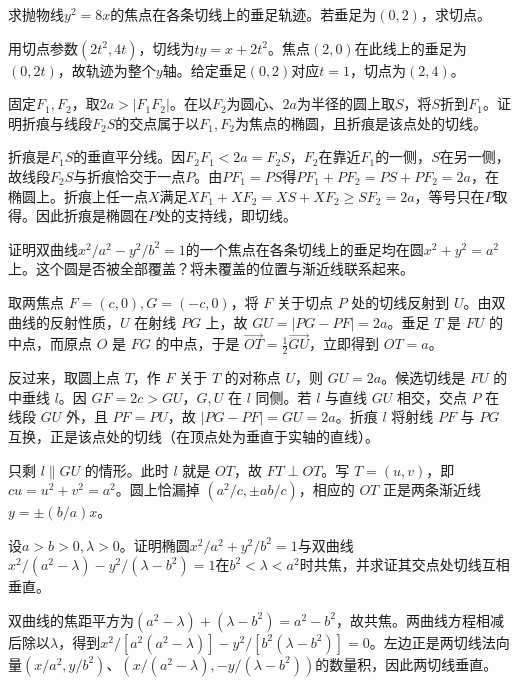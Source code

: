 求抛物线\(y^2=8x\)的焦点在各条切线上的垂足轨迹。若垂足为\((0,2)\)，求切点。
\par
\solutionanswer
用切点参数\((2t^2,4t)\)，切线为\(ty=x+2t^2\)。焦点\((2,0)\)在此线上的垂足为\((0,2t)\)，故轨迹为整个\(y\)轴。给定垂足\((0,2)\)对应\(t=1\)，切点为\((2,4)\)。


固定\(F_1,F_2\)，取\(2a>|F_1F_2|\)。在以\(F_2\)为圆心、\(2a\)为半径的圆上取\(S\)，将\(S\)折到\(F_1\)。证明折痕与线段\(F_2S\)的交点属于以\(F_1,F_2\)为焦点的椭圆，且折痕是该点处的切线。
\par
\solutionanswer
折痕是\(F_1S\)的垂直平分线。因\(F_2F_1<2a=F_2S\)，\(F_2\)在靠近\(F_1\)的一侧，\(S\)在另一侧，故线段\(F_2S\)与折痕恰交于一点\(P\)。由\(PF_1=PS\)得\(PF_1+PF_2=PS+PF_2=2a\)，在椭圆上。折痕上任一点\(X\)满足\(XF_1+XF_2=XS+XF_2\ge SF_2=2a\)，等号只在\(P\)取得。因此折痕是椭圆在\(P\)处的支持线，即切线。


证明双曲线\(x^2/a^2-y^2/b^2=1\)的一个焦点在各条切线上的垂足均在圆\(x^2+y^2=a^2\)上。这个圆是否被全部覆盖？将未覆盖的位置与渐近线联系起来。
\par
\solutionanswer
取两焦点 \(F=(c,0),G=(-c,0)\)，将 \(F\) 关于切点 \(P\) 处的切线反射到 \(U\)。由双曲线的反射性质，\(U\) 在射线 \(PG\) 上，故 \(GU=|PG-PF|=2a\)。垂足 \(T\) 是 \(FU\) 的中点，而原点 \(O\) 是 \(FG\) 的中点，于是 \(\overrightarrow{OT}=\tfrac12\overrightarrow{GU}\)，立即得到 \(OT=a\)。

反过来，取圆上点 \(T\)，作 \(F\) 关于 \(T\) 的对称点 \(U\)，则 \(GU=2a\)。候选切线是 \(FU\) 的中垂线 \(l\)。因 \(GF=2c>GU\)，\(G,U\) 在 \(l\) 同侧。若 \(l\) 与直线 \(GU\) 相交，交点 \(P\) 在线段 \(GU\) 外，且 \(PF=PU\)，故 \(|PG-PF|=GU=2a\)。折痕 \(l\) 将射线 \(PF\) 与 \(PG\) 互换，正是该点处的切线（在顶点处为垂直于实轴的直线）。

只剩 \(l\parallel GU\) 的情形。此时 \(l\) 就是 \(OT\)，故 \(FT\perp OT\)。写 \(T=(u,v)\)，即 \(cu=u^2+v^2=a^2\)。圆上恰漏掉 \((a^2/c,\pm ab/c)\)，相应的 \(OT\) 正是两条渐近线 \(y=\pm(b/a)x\)。


设\(a>b>0,\lambda>0\)。证明椭圆\(x^2/a^2+y^2/b^2=1\)与双曲线\(x^2/(a^2-\lambda)-y^2/(\lambda-b^2)=1\)在\(b^2<\lambda<a^2\)时共焦，并求证其交点处切线互相垂直。
\par
\solutionanswer
双曲线的焦距平方为\((a^2-\lambda)+(\lambda-b^2)=a^2-b^2\)，故共焦。两曲线方程相减后除以\(\lambda\)，得到\(x^2/[a^2(a^2-\lambda)]-y^2/[b^2(\lambda-b^2)]=0\)。左边正是两切线法向量\((x/a^2,y/b^2)\)、\((x/(a^2-\lambda),-y/(\lambda-b^2))\)的数量积，因此两切线垂直。


